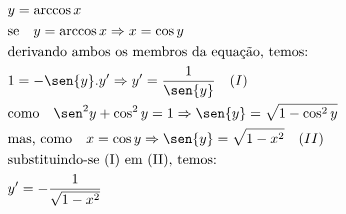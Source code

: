 \begin{ex}
\begin{align}
&y=\arccos{x}\nonumber\\
&\text{se}\quad y=\arccos{x} \Rightarrow x=\cos{y}\nonumber\\
&\text{derivando ambos os membros da equação, temos:}\nonumber\\
&1=-\sen{y}.y' \Rightarrow y'=\frac{1}{\sen{y}}\quad (I)\nonumber\\
&\text{como}\quad \sen^2{y}+\cos^2{y}=1 \Rightarrow \sen{y}=\sqrt{1-\cos^2{y}}\nonumber\\
&\text{mas, como} \quad x=\cos{y} \Rightarrow \sen{y}=\sqrt{1-x^2} \quad (II)\nonumber\\
&\text{substituindo-se (I) em (II), temos:}\nonumber\\
&y'=-\frac{1}{\sqrt{1-x^2}}\nonumber
\end{align}
\end{ex}